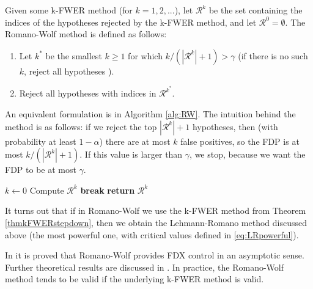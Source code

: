 \documentclass[11pt]{article}
\theoremstyle{plain}
\theoremstyle{definition}
\newcommand{\R}{\mathcal{R}}
\newcommand{\citt}{\citet}
\begin{document}
Given some k-FWER method (for $k=1,2,...$), let $\R^k$ be the set containing the indices of the hypotheses rejected by the k-FWER method, and let $\R^0=\emptyset$. The Romano-Wolf method is defined as follows:
\begin{enumerate}
\item Let $k^*$ be the smallest $k\geq 1$ for which $k/(|\R^k|+1)>\gamma$ (if there is no such $k$, reject all hypotheses ). 
\item Reject all hypotheses with indices in $\R^{k^*}$.
\end{enumerate}
An equivalent formulation is in  Algorithm \ref{alg:RW}.
The intuition behind the method is as follows: if we reject the top $|\R^k|+1$ hypotheses, then (with probability at least $1-\alpha$) there are at most $k$ false positives, so the FDP is at most  $k/(|\R^k|+1)$. If this value is larger than $\gamma$, we stop, because we want the FDP to be at most $\gamma$.



\begin{algorithm}[H] 
\caption{Algorithm for the Romano-Wolf method. Algorithm 4.1 from \citt{romano2007control} is the same, except that it checks whether $|\R^k|<k/\gamma -1$, which is equivalent to checking whether $k/(|\R^k|+1)>\gamma$.} \label{alg:RW}
\begin{algorithmic}[1]
\STATE $k\leftarrow0$
      \STATE Compute $\R^k$
    \IF{$k/(|\R^k|+1)>\gamma$}
      \STATE \textbf{break}
    \ENDIF
\ENDFOR
	\STATE \textbf{return} $\R^k$
\end{algorithmic}
\end{algorithm}

It turns out that if in Romano-Wolf we use the k-FWER method from Theorem \ref{thmkFWERstepdown}, then we obtain the Lehmann-Romano method discussed above (the most powerful one, with critical values defined in \eqref{eq:LRpowerful}).

In \citt{romano2007control} it is proved that Romano-Wolf provides FDX control in an asymptotic sense. Further theoretical results are discussed in \citt{delattre2015new}. In practice, the Romano-Wolf method tends to be valid if the underlying k-FWER method is valid.
\end{document}
